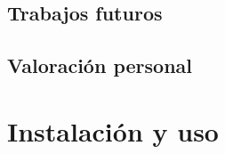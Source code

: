 \documentclass[a4paper, 12pt]{book}
\begin{document}
\section{Trabajos futuros}
\label{sec:trabajos_futuros}



\section{Valoraci\'on personal}
\label{sec:valoracion}





\cleardoublepage
\chapter{Instalaci\'on y uso}
\label{app:instalacionuso}
\end{document}
